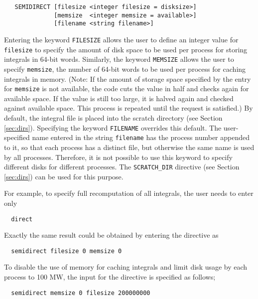 \begin{verbatim}
   SEMIDIRECT [filesize <integer filesize = disksize>] 
              [memsize  <integer memsize = available>]
              [filename <string filename>]
\end{verbatim}
Entering the keyword \verb+FILESIZE+ allows the user to define
an integer value for \verb+filesize+ to specify the amount of disk space 
to be used per process
for storing integrals in 64-bit words.  Similarly, the keyword
\verb+MEMSIZE+ allows the user to specify \verb+memsize+,
the number of 64-bit words to be used per process for
caching integrals in memory. (Note: If the amount of storage space
specified by the entry for \verb+memsize+ is not available, 
the code cuts the value in half and checks again for available space.
If the value is still too large, it is halved again and checked against
available space.  This process is repeated until the request is satisfied.)
By default, the integral file is placed into the scratch directory
(see Section \ref{sec:dirs}). Specifying the keyword \verb+FILENAME+ 
overrides this default.  The user-specified name entered in the string
\verb+filename+ has the process number appended to it, so that
each process has a distinct file, but otherwise the same name is used by all
processes.  Therefore, it is not possible to use this keyword to specify
different disks for different processes.  The \verb+SCRATCH_DIR+ directive
(see Section \ref{sec:dirs}) can be used for this purpose.  


For example, to specify full recomputation of all integrals, the user
needs to enter only

\begin{verbatim}
  direct
\end{verbatim}

Exactly the same result could be obtained by entering the directive as

\begin{verbatim}
  semidirect filesize 0 memsize 0
\end{verbatim}

To disable the use of memory for caching integrals and
limit disk usage by each process to 100 MW, the input for the directive is
specified as follows;

\begin{verbatim}
  semidirect memsize 0 filesize 200000000
\end{verbatim}



